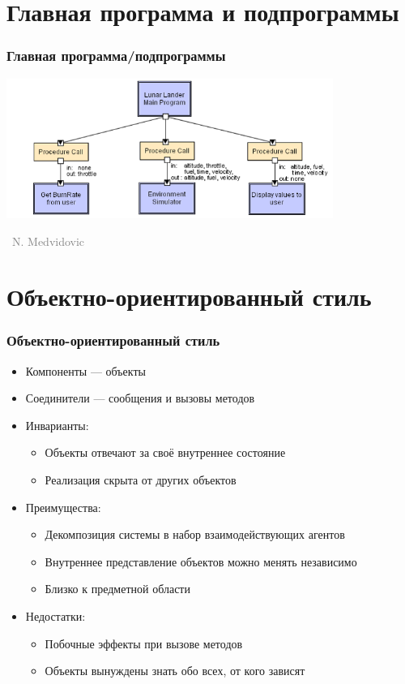 \documentclass[xetex,mathserif,serif]{beamer}
\newcommand{\attribution}[1] {
	\vspace{-5mm}\begin{flushright}\begin{scriptsize}\textcolor{gray}{\textcopyright\, #1}\end{scriptsize}\end{flushright}
}
\begin{document}
	\section{Главная программа и подпрограммы}

	\begin{frame}
		\frametitle{Главная программа/подпрограммы}
		\begin{center}
			\includegraphics[width=0.8\textwidth]{mainProgramAndSubroutinesLL.png}
			\attribution{N. Medvidovic}
		\end{center}
	\end{frame}

	\section{Объектно-ориентированный стиль}

	\begin{frame}
		\frametitle{Объектно-ориентированный стиль}
		\begin{itemize}
			\item Компоненты --- объекты
			\item Соединители --- сообщения и вызовы методов
			\item Инварианты:
			\begin{itemize}
				\item Объекты отвечают за своё внутреннее состояние
				\item Реализация скрыта от других объектов
			\end{itemize}
			\item Преимущества:
			\begin{itemize}
				\item Декомпозиция системы в набор взаимодействующих агентов
				\item Внутреннее представление объектов можно менять независимо
				\item Близко к предметной области
			\end{itemize}
			\item Недостатки:
			\begin{itemize}
				\item Побочные эффекты при вызове методов
				\item Объекты вынуждены знать обо всех, от кого зависят
			\end{itemize}
		\end{itemize}
	\end{frame}
\end{document}
